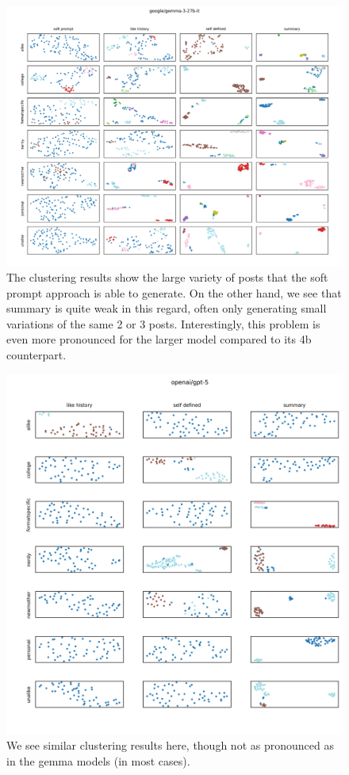 \documentclass[11pt]{article}
\begin{document}
\begin{figure}[h]
    \centering
    \includegraphics[width=\linewidth]{visuals/clustering/embeddings_google-gemma-3-27b-it_page_1}
    \caption{The clustering results show the large variety of posts that the soft prompt approach is able to generate. On the other hand, we see that summary is quite weak in this regard, often only generating small variations of the same 2 or 3 posts. Interestingly, this problem is even more pronounced for the larger model compared to its 4b counterpart.}
    \label{fig:clustering-gemma-3-27b}
\end{figure}

\begin{figure}[h]
    \centering
    \includegraphics[width=\linewidth]{visuals/clustering/embeddings_openai-gpt-5_page_1}
    \caption{We see similar clustering results here, though not as pronounced as in the gemma models (in most cases).}
    \label{fig:clustering-gemma-3-4b}
\end{figure}
\end{document}
